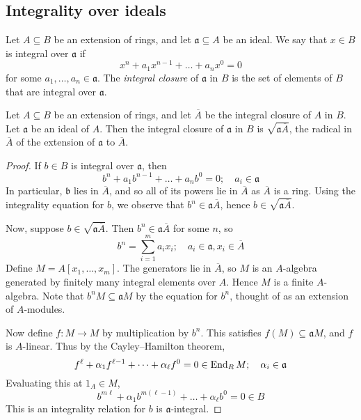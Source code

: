 \subsection{Integrality over ideals}
\begin{definition}
    Let \( A \subseteq B \) be an extension of rings, and let \( \mathfrak a \subseteq A \) be an ideal.
    We say that \( x \in B \) is integral over \( \mathfrak a \) if
    \[ x^n + a_1 x^{n-1} + \dots + a_n x^0 = 0 \]
    for some \( a_1, \dots, a_n \in \mathfrak a \).
    The \emph{integral closure} of \( \mathfrak a \) in \( B \) is the set of elements of \( B \) that are integral over \( \mathfrak a \).
\end{definition}
\begin{proposition}
    Let \( A \subseteq B \) be an extension of rings, and let \( \overline A \) be the integral closure of \( A \) in \( B \).
    Let \( \mathfrak a \) be an ideal of \( A \).
    Then the integral closure of \( \mathfrak a \) in \( B \) is \( \sqrt{\mathfrak a \overline A} \), the radical in \( \overline A \) of the extension of \( \mathfrak a \) to \( \overline A \).
\end{proposition}
\begin{proof}
    If \( b \in B \) is integral over \( \mathfrak a \), then
    \[ b^n + a_1 b^{n-1} + \dots + a_n b^0 = 0;\quad a_i \in \mathfrak a \]
    In particular, \( \mathfrak b \) lies in \( \overline A \), and so all of its powers lie in \( \overline A \) as \( \overline A \) is a ring.
    Using the integrality equation for \( b \), we observe that \( b^n \in \mathfrak a \overline A \), hence \( b \in \sqrt{\mathfrak a \overline A} \).

    Now, suppose \( b \in \sqrt{\mathfrak a \overline A} \).
    Then \( b^n \in \mathfrak a \overline A \) for some \( n \), so
    \[ b^n = \sum_{i=1}^m a_i x_i;\quad a_i \in \mathfrak a, x_i \in \overline A \]
    Define \( M = A[x_1, \dots, x_m] \).
    The generators lie in \( \overline A \), so \( M \) is an \( A \)-algebra generated by finitely many integral elements over \( A \).
    Hence \( M \) is a finite \( A \)-algebra.
    Note that \( b^n M \subseteq \mathfrak a M \) by the equation for \( b^n \), thought of as an extension of \( A \)-modules.

    Now define \( f : M \to M \) by multiplication by \( b^n \).
    This satisfies \( f(M) \subseteq \mathfrak a M \), and \( f \) is \( A \)-linear.
    Thus by the Cayley--Hamilton theorem,
    \[ f^\ell + \alpha_1 f^{\ell - 1} + \dots + \alpha_\ell f^0 = 0 \in \operatorname{End}_R M;\quad \alpha_i \in \mathfrak a \]
    Evaluating this at \( 1_A \in M \),
    \[ b^{m\ell} + \alpha_1 b^{m(\ell - 1)} + \dots + \alpha_\ell b^0 = 0 \in B \]
    This is an integrality relation for \( b \) is \( \mathfrak a \)-integral.
\end{proof}
